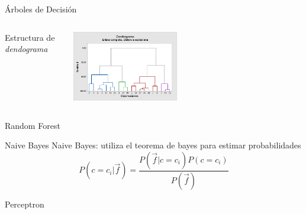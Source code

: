 \documentclass[11pt]{beamer}
\begin{document}
\begin{frame}{\'Arboles de Decisi\'on}
    \begin{columns}
    \begin{column}{0.5\textwidth}
    Estructura de \textit{dendograma}
    \end{column}
    
    \begin{column}{0.5\textwidth}
    \begin{center}
    \includegraphics[width=0.45\textwidth]{images/cluster_obs_dendrogram_with_final_partition_glove_testers.png}    
    \end{center}
    \end{column}
    
    \end{columns}
\end{frame}
\begin{frame}{Random Forest}
    
\end{frame}
\begin{frame}{Naive Bayes}
    Naive Bayes: utiliza el teorema de bayes para estimar probabilidades
    $$P(c=c_i|\vec{f}) = \frac{P(\vec{f}|c=c_i)P(c=c_i)}{P(\vec{f})}$$
\end{frame}
\begin{frame}{Perceptron}
    
\end{frame}
\end{document}
